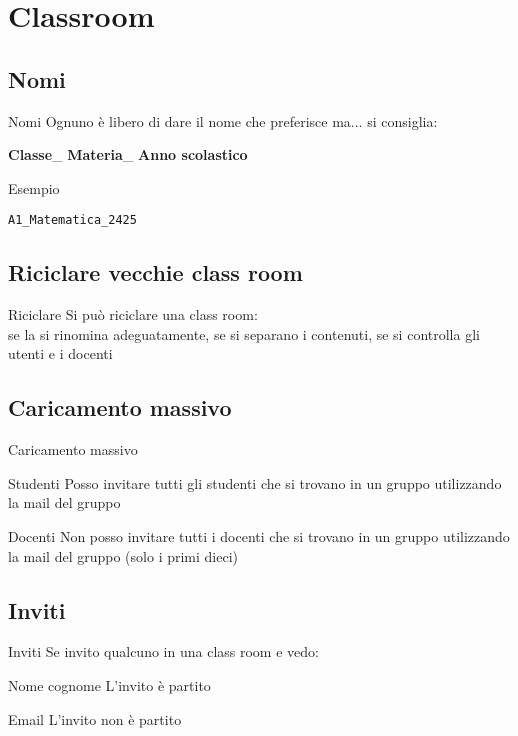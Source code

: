 \section{Classroom}
\subsection{Nomi}
\begin{frame}{Nomi}
	Ognuno è libero di dare il nome che preferisce ma... si consiglia:
	
	\textbf{Classe}\_ \textbf{Materia}\_ \textbf{Anno scolastico}
	
	Esempio
	
	\texttt{A1\_Matematica\_2425}
\end{frame}
\subsection{Riciclare vecchie class room}
\begin{frame}{Riciclare}
Si può riciclare una class room:\\
se la si rinomina adeguatamente, se si separano i contenuti, se si controlla gli utenti e i docenti
\end{frame}
\subsection{Caricamento massivo}
\begin{frame}{Caricamento massivo}
\begin{alertblock}{Studenti}
Posso invitare tutti gli studenti che si trovano in un gruppo utilizzando la mail del gruppo
\end{alertblock}
\begin{alertblock}{Docenti}
	Non posso invitare tutti i docenti che si trovano in un gruppo utilizzando la mail del gruppo (solo i primi dieci)
\end{alertblock}
\end{frame}
\subsection{Inviti}
\begin{frame}{Inviti}
	Se invito qualcuno in una class room e vedo:
	\begin{alertblock}{Nome cognome}
		L'invito è partito
	\end{alertblock}
	\begin{alertblock}{Email}
		L'invito non è partito
	\end{alertblock}
\end{frame}